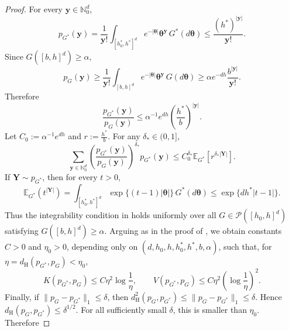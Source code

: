\documentclass[twoside,12pt]{article}
\newcommand{\E}{\mathds{E}}
\begin{document}
\begin{proof}
For every $\boldsymbol y\in\mathbb N_0^d$,
\begin{displaymath}
p_{G^\ast}(\boldsymbol y)=\frac{1}{\boldsymbol y!}\int_{[h_{0}^{\ast},h^\ast]^d}e^{-|\boldsymbol\theta|}\boldsymbol\theta^{\boldsymbol y}\,G^\ast(d\boldsymbol\theta)\le\frac{(h^\ast)^{|\boldsymbol y|}}{\boldsymbol y!}.
\end{displaymath}
Since $G([b,h]^d)\ge\alpha$,
\begin{displaymath}
p_G(\boldsymbol y)\ge\frac{1}{\boldsymbol y!}\int_{[b,h]^d}e^{-|\boldsymbol\theta|}\boldsymbol\theta^{\boldsymbol y}\,G(d\boldsymbol\theta)\ge\alpha e^{-dh}\frac{b^{|\boldsymbol y|}}{\boldsymbol y!}.
\end{displaymath}
Therefore
\begin{displaymath}
\frac{p_{G^\ast}(\boldsymbol y)}{p_G(\boldsymbol y)}\le\alpha^{-1}e^{dh}\left(\frac{h^\ast}{b}\right)^{|\boldsymbol y|}.
\end{displaymath}
Let $C_0:=\alpha^{-1}e^{dh}$ and $r:=\frac{h^\ast}{b}$. For any $\delta_\ast\in(0,1]$,
\begin{displaymath}
\sum_{\boldsymbol y\in\mathbb N_0^d}\left(\frac{p_{G^\ast}(\boldsymbol y)}{p_G(\boldsymbol y)}\right)^{\delta_\ast}p_{G^\ast}(\boldsymbol y)\le C_0^{\delta_\ast}
\E_{G^\ast}\!\left[r^{\delta_\ast|\boldsymbol Y|}\right].
\end{displaymath}
If $\boldsymbol Y\sim p_{G^\ast}$, then for every $t>0$,
\begin{displaymath}
\E_{G^\ast}(t^{|\boldsymbol Y|})=\int_{[h_{0}^{\ast},h^\ast]^d}\exp\{(t-1)|\boldsymbol\theta|\}\,G^\ast(d\boldsymbol\theta)\le\exp\{dh^\ast |t-1|\}.
\end{displaymath}
Thus the integrability condition in \citet[Theorem 5]{Won(95)} holds uniformly over all $G\in\mathcal P([h_{0},h]^d)$ satisfying $G([b,h]^d)\ge\alpha$. Arguing as in the proof of \citet[Lemma 4.1]{Gho(01)}, we obtain constants $C>0$ and $\eta_0>0$, depending only on $(d,h_0,h,h_0^\ast,h^\ast,b,\alpha)$, such that, for
$\eta=d_{\mathrm H}(p_{G^\ast},p_G)<\eta_0$,
\begin{displaymath}
K(p_{G^\ast},p_G)\le C\eta^2\log\frac{1}{\eta}, \qquad V(p_{G^\ast},p_G)\le C\eta^2\left(\log\frac{1}{\eta}\right)^2.
\end{displaymath}
Finally, if $\|p_G-p_{G^\ast}\|_1\le\delta$, then $d_{\mathrm H}^2(p_G,p_{G^\ast})\le\|p_G-p_{G^\ast}\|_1\le\delta$. Hence $d_{\mathrm H}(p_G,p_{G^\ast})\le\delta^{1/2}$. For all sufficiently small $\delta$, this is smaller than $\eta_0$. Therefore

\end{proof}
\end{document}
